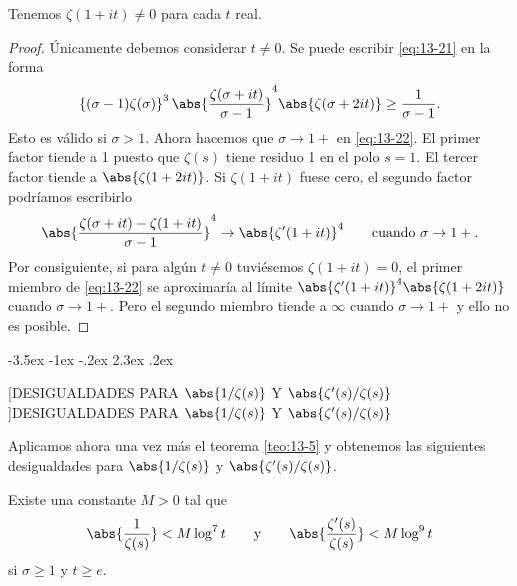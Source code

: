 \documentclass[12pt,a4paper]{book}
\makeatletter
\renewcommand\section{\@startsection{section}{1}{\z@}%
  {-3.5ex \@plus -1ex \@minus -.2ex}%
  {2.3ex \@plus .2ex}%
  {\normalfont\Large\bfseries\raggedright}}
\makeatother
\begin{document}
    \begin{teorema}\label{teo:13-6}
        Tenemos $\zeta(1+it)\neq0$ para cada $t$ real.
    \end{teorema}

    \begin{proof}
        Únicamente debemos considerar $t\neq0$. Se puede escribir \eqref{eq:13-21} en la forma
        \begin{equation}\label{eq:13-22}
            \left\{(\sigma-1)\zeta(\sigma)\right\}^{3}\abs{\frac{\zeta(\sigma+it)}{\sigma-1}}^{4}\abs{\zeta(\sigma+2it)}\geq\frac{1}{\sigma-1}.
        \end{equation}
        Esto es válido si $\sigma>1$. Ahora hacemos que $\sigma\to1+$ en \eqref{eq:13-22}. El
        primer factor tiende a 1 puesto que $\zeta(s)$ tiene residuo 1 en el polo $s=1$. El
        tercer factor tiende a $\abs{\zeta(1+2it)}$. Si $\zeta(1+it)$ fuese cero, el segundo
        factor podríamos escribirlo
        \begin{equation*}
            \abs{\frac{\zeta(\sigma+it)-\zeta(1+it)}{\sigma-1}}^{4}\to\abs{\zeta'(1+it)}^{4}\qquad\text{cuando }\sigma\to1+.
        \end{equation*}
        Por consiguiente, si para algún $t\neq0$ tuviésemos $\zeta(1+it)=0$, el primer miembro
        de \eqref{eq:13-22} se aproximaría al límite $\abs{\zeta'(1+it)}^{4}\abs{\zeta(1+2it)}$
        cuando $\sigma\to1+$. Pero el segundo miembro tiende a $\infty$ cuando $\sigma\to1+$ y
        ello no es posible.
    \end{proof}

    \section[DESIGUALDADES PARA \texorpdfstring{$\abs{1/\zeta(s)}$}{|1/ζ(s)|} Y \texorpdfstring{$\abs{\zeta'(s)/\zeta(s)}$}{|ζ'(s)/ζ(s)|}]{DESIGUALDADES PARA \texorpdfstring{$\abs{1/\zeta(s)}$}{|1/ζ(s)|} Y \texorpdfstring{$\abs{\zeta'(s)/\zeta(s)}$}{|ζ'(s)/ζ(s)|}}

    Aplicamos ahora una vez más el teorema \ref{teo:13-5} y obtenemos las siguientes
    desigualdades para $\abs{1/\zeta(s)}$ y $\abs{\zeta'(s)/\zeta(s)}$.

    \begin{teorema}\label{teo:13-7}
        Existe una constante $M>0$ tal que
        \begin{equation*}
            \abs{\frac{1}{\zeta(s)}}<M\log^{7}t\qquad\text{y}\qquad\abs{\frac{\zeta'(s)}{\zeta(s)}}<M\log^{9}t
        \end{equation*}
        si $\sigma\geq1$ y $t\geq e$.
    \end{teorema}
\end{document}
